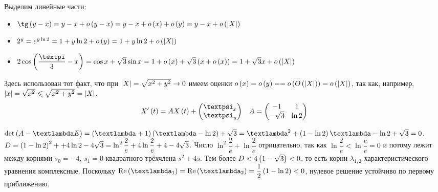 \documentclass[a5paper,10pt]{article}
\begin{document}
Выделим линейные части:
    
\begin{itemize}
    \item $\tg\br{y - x} = y - x + o\br{y - x} = y - x + o\br{x} + o\br{y} = y - x + o\br{\vbr{X}}$

    \item $2^{y} = e^{y \ln 2} = 1 + y \ln 2 + o\left(y\right) = 1 + y \ln 2 + o\left(\left|X\right|\right)$
    
    \item $2 \cos\br{\dfrac {\pi} {3} - x} = \cos x + \sqrt{3} \sin x = 1 + o\br{x} + \sqrt{3} \br{x + o\br{x}} = 1 + \sqrt{3}x + o\br{\vbr{X}}$
\end{itemize}

Здесь использован тот факт, что при $\left|X\right| = \sqrt{x^2 + y^2} \to 0$ имеем оценки $o\br{x} = o\br{y} = \linebreak = o\br{O\br{\vbr{X}}} = o\br{\vbr{X}}$, так как, например, $\left|x\right| = \sqrt{x^2} \leqslant \sqrt{x^2 + y^2} = \left|X\right|$.
\begin{align*}
    X'\br{t} = A X\br{t} + \begin{pmatrix} \psi_{x} \\ \psi_{y} \end{pmatrix} && A = \begin{pmatrix}-1 & 1 \\ -\sqrt{3} & \ln 2 \end{pmatrix}
\end{align*}

$\det\br{A - \lambda E} = \br{\lambda + 1} \br{\lambda - \ln 2} + \sqrt{3} = \lambda^2 + \br{1 - \ln 2}\lambda - \ln 2 + \sqrt{3} = 0$. $D = \br{1 - \ln 2}^2 + \linebreak + 4\ln 2 - 4\sqrt{3} = \ln^2 \dfrac {2} {e} + 4\ln \dfrac {2} {e} + 4 - 4\sqrt{3}$. Число $\ln^2 \dfrac {2} {e} + \ln \dfrac {2} {e}$ отрицательно, так как $\ln \dfrac {2} {e} < \ln \dfrac {e} {e} = 0$ и потому лежит между корнями $s_{0} = -4$, $s_{1} = 0$ квадратного трёхчлена $s^2 + 4s$. Тем более $D < 4 \left(1 - \sqrt{3}\right) < 0$, то есть корни $\lambda_{1, 2}$ характеристического уравнения комплексные. Поскольку $\Re\br{\lambda_{1}} = \Re\br{\lambda_{2}} = \dfrac {1} {2} \br{1 - \ln 2} < 0$, нулевое решение устойчиво по первому приближению. 
\end{document}

